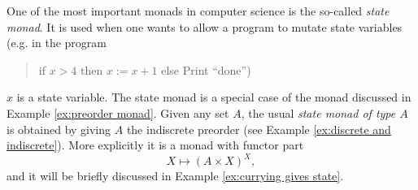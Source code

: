 \documentclass[CT4S-EN-RU]{subfiles}
\begin{document}
\begin{remark}\label{rem:state monad}

One of the most important monads in computer science is the so-called {\em state monad}. It is used when one wants to allow a program to mutate state variables (e.g. in the program 
\begin{quote}if $x>4$ then $x:=x+1$ else Print “done”)\end{quote}
$x$ is a state variable. The state monad is a special case of the monad discussed in Example \ref{ex:preorder monad}. Given any set $A$, the usual {\em state monad of type $A$} is obtained by giving $A$ the indiscrete preorder (see Example \ref{ex:discrete and indiscrete}). More explicitly it is a monad with functor part $$X\mapsto (A\times X)^X,$$ and it will be briefly discussed in Example \ref{ex:currying gives state}.

\end{remark}
\end{document}
